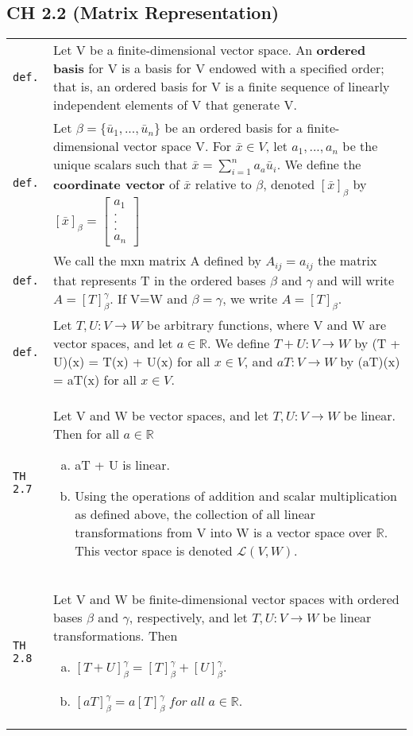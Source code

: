 \documentclass[10pt,landscape]{article}
\begin{document}
\begin{multicols}{3}
\section{CH 2.2 (Matrix Representation)}
\begin{tabular}{@{}p{\the\MyLen}%
                @{}p{\linewidth-\the\MyLen}@{}} %
\verb!def.! & Let V be a finite-dimensional vector space. An \textbf{ordered basis} for V is a basis for V endowed with a specified order; that is, an ordered basis for V is a finite sequence of linearly independent elements of V that generate V.\\
\verb!def.! & Let $\beta = \{\bar u_1,...,\bar u_n\}$ be an ordered basis for a finite-dimensional vector space V. For $\bar x\!\in\! V$, let $a_1,...,a_n$ be the unique scalars such that $\bar x = \sum_{i=1}^n a_a\bar u_i$.
		   We define the \textbf{coordinate vector} of $\bar x$ relative to $\beta$, denoted $[\bar x]_\beta$ by $[\bar x]_\beta = \begin{bmatrix} a_1 \\ . \\ . \\ . \\ a_n\end{bmatrix}$\\
\verb!def.! & We call the mxn matrix A defined by $A_{ij} = a_{ij}$ the matrix that represents T  in the ordered bases $\beta$ and $\gamma$ and will write $A = [T]_\beta^\gamma$. If V=W and $\beta = \gamma$, we write $A=[T]_\beta$.\\
\verb!def.! & Let $T,U:V\rightarrow W$ be arbitrary functions, where V and W are vector spaces, and let $a\!\in\!\mathbb{R}$. We define $T + U:V\rightarrow W$ by (T + U)(x) = T(x) + U(x) for all $x\!\in\! V$, and $aT:V\rightarrow W$ by (aT)(x) = aT(x) for all $x\!\in\! V$.\\
\verb!TH 2.7! & Let V and W be vector spaces, and let $T,U:V\rightarrow W$ be linear. Then for all $a\!\in\!\mathbb{R}$
			\begin{enumerate}[a)]
			\item aT + U is linear.
			\item Using the operations of addition and scalar multiplication as defined above, the collection of all linear transformations from V into W is a vector space over $\mathbb{R}$. This vector space is denoted $\mathscr{L} (V,W)$.
			\end{enumerate}\\
\verb!TH 2.8! & Let V and W be finite-dimensional vector spaces with ordered bases $\beta$ and $\gamma$, respectively, and let $T,U:V\rightarrow W$ be linear transformations. Then
			\begin{enumerate}[a)]
			\item $[T + U]_\beta^\gamma = [T]_\beta^\gamma + [U]_\beta^\gamma$.
			\item $[aT]_\beta^\gamma = a[T]_\beta^\gamma \; for \; all \; a\!\in\!\mathbb{R}$.
			\end{enumerate}
\end{tabular}



\end{multicols}
\end{document}
